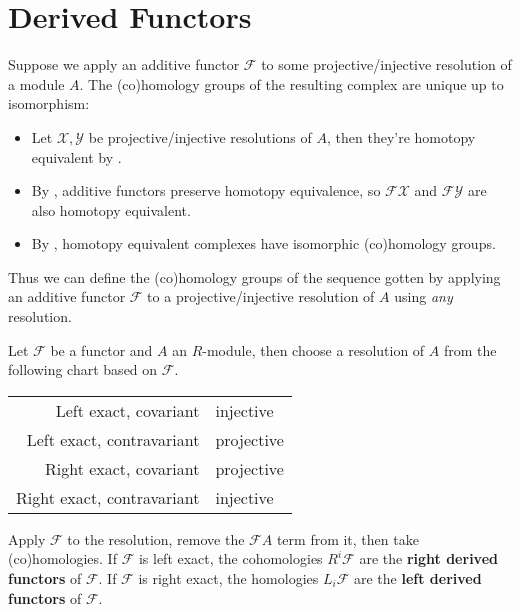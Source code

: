 \documentclass[twoside,10pt]{report}
\begin{document}
\section{Derived Functors}

Suppose we apply an additive functor $\mathcal{F}$ to some projective/injective resolution of a module $A$. The (co)homology groups of the resulting complex are unique up to isomorphism:
\begin{itemize}
	\item Let $\mathcal{X},\mathcal{Y}$ be projective/injective resolutions of $A$, then they're homotopy equivalent by .
	\item By , additive functors preserve homotopy equivalence, so $\mathcal{F}\mathcal{X}$ and $\mathcal{F}\mathcal{Y}$ are also homotopy equivalent.
	\item By , homotopy equivalent complexes have isomorphic (co)homology groups.
\end{itemize}

Thus we can define the (co)homology groups of the sequence gotten by applying an additive functor $\mathcal{F}$ to a projective/injective resolution of $A$ using \textit{any} resolution.

\begin{defn}[]
Let $\mathcal{F}$ be a functor and $A$ an $R$-module, then choose a resolution of $A$ from the following chart based on $\mathcal{F}$.
\begin{center}
	\begin{tabular}{r l}
		Left exact, covariant & \qquad injective \\
		Left exact, contravariant & \qquad projective \\
		Right exact, covariant & \qquad projective \\
		Right exact, contravariant & \qquad injective
	\end{tabular}
\end{center}
Apply $\mathcal{F}$ to the resolution, remove the $\mathcal{F}A$ term from it, then take (co)homologies. If $\mathcal{F}$ is left exact, the cohomologies $R^{i}\mathcal{F}$ are the \textbf{right derived functors} of $\mathcal{F}$. If $\mathcal{F}$ is right exact, the homologies $L_{i}\mathcal{F}$ are the \textbf{left derived functors} of $\mathcal{F}$.
\end{defn}

\end{document}
